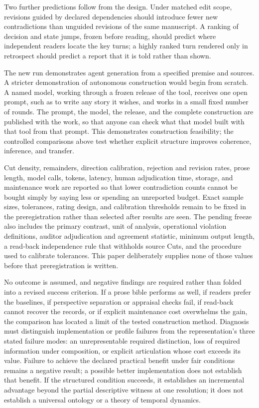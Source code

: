 \documentclass[11pt,a4paper]{article}
\begin{document}
Two further predictions follow from the design. Under matched edit scope,
revisions guided by declared dependencies should introduce fewer new
contradictions than unguided revisions of the same manuscript. A ranking of
decision and state jumps, frozen before reading, should predict where
independent readers locate the key turns; a highly ranked turn rendered only in
retrospect should predict a report that it is told rather than shown.

The new run demonstrates agent generation from a specified premise and sources.
A stricter demonstration of autonomous construction would begin from scratch. A named model,
working through a frozen release of the tool, receives one open prompt, such as to
write any story it wishes, and works in a small fixed number of rounds. The
prompt, the model, the release, and the complete construction are published with
the work, so that anyone can check what that model built with that tool from that
prompt. This demonstrates construction feasibility; the controlled comparisons
above test whether explicit structure improves coherence, inference, and transfer.

Cut density, remainders, direction calibration, rejection and revision rates,
prose length, model calls, tokens, latency, human adjudication time, storage,
and maintenance work are reported so that lower contradiction counts cannot be
bought simply by saying less or spending an unreported budget. Exact sample
sizes, tolerances, rating design, and calibration thresholds remain to be fixed
in the preregistration rather than selected after results are seen. The pending
freeze also includes the primary contrast, unit of analysis, operational
violation definitions, auditor adjudication and agreement statistic, minimum
output length, a read-back independence rule that withholds source Cuts, and
the procedure used to calibrate tolerances. This paper deliberately supplies
none of those values before that preregistration is written.

No outcome is assumed, and negative findings are required rather than folded
into a revised success criterion. If a prose bible performs as well, if readers
prefer the baselines, if perspective separation or appraisal checks fail, if
read-back cannot recover the records, or if explicit maintenance cost
overwhelms the gain, the comparison has located a limit of the tested
construction method. Diagnosis must distinguish implementation or profile
failures from the representation's three stated failure modes: an unrepresentable
required distinction, loss of required information under composition, or explicit
articulation whose cost exceeds its value. Failure to achieve the declared
practical benefit under fair conditions remains a negative result; a possible
better implementation does not establish that benefit. If the structured condition succeeds, it establishes an
incremental advantage beyond the partial descriptive witness at one
resolution; it does not establish a universal ontology or a theory of temporal
dynamics.
\end{document}
